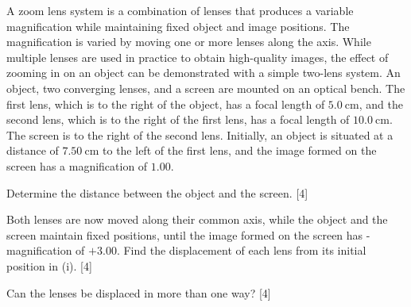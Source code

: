 \begin{problem}
    A zoom lens system is a combination of lenses that produces a variable magnification while maintaining fixed object and image positions. The magnification is varied by moving one or more lenses along the axis. While multiple lenses are used in practice to obtain high-quality images, the effect of zooming in on an object can be demonstrated with a simple two-lens system. An object, two converging lenses, and a screen are mounted on an optical bench. The first lens, which is to the right of the object, has a focal length of $\qty{5.0}{\cm}$, and the second lens, which is to the right of the first lens, has a focal length of $\qty{10.0}{\cm}$. The screen is to the right of the second lens. Initially, an object is situated at a distance of $\qty{7.50}{\cm}$ to the left of the first lens, and the image formed on the screen has a magnification of $1.00$.
    \begin{subproblem}
        Determine the distance between the object and the screen.
    \hfill{[4]}\end{subproblem}

    \begin{subproblem}
        Both lenses are now moved along their common axis, while the object and the screen maintain fixed positions, until the image formed on the screen has - magnification of $+3.00$. Find the displacement of each lens from its initial position in (i).
    \hfill{[4]}\end{subproblem}

    \begin{subproblem}
        Can the lenses be displaced in more than one way?
    \hfill{[4]}\end{subproblem}
\end{problem}


